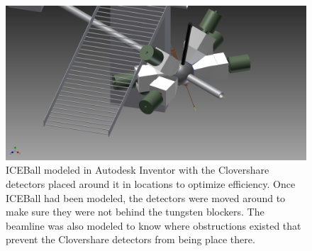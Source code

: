 \begin{figure}[t]
    \centering
    \includegraphics[scale=0.3]{Setup_Figs/FullyAssembled-50cm-newpositions-rightiso.png}
    \caption{ICEBall modeled in Autodesk Inventor \citep{autodesk:_inventor} with the Clovershare detectors placed around it in locations to optimize efficiency. Once ICEBall had been modeled, the detectors were moved around to make sure they were not behind the tungsten blockers. The beamline was also modeled to know where obstructions existed that prevent the Clovershare detectors from being place there.}
    \label{fig:inventor}
\end{figure}